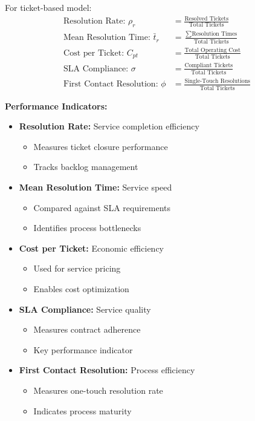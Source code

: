 \documentclass[12pt,a4paper]{article}
\newenvironment{definition}[1]
{\begin{mdframed}[style=definitionstyle,frametitle={Definition: #1}]}
{\end{mdframed}}
\newenvironment{explanation}
{\begin{mdframed}[style=explanationstyle,frametitle={Explanation}]}
{\end{mdframed}}
\begin{document}
\begin{definition}{Ticket Performance Metrics}
For ticket-based model:
\begin{align*}
    \text{Resolution Rate: } \rho_r &= \frac{\text{Resolved Tickets}}{\text{Total Tickets}} \\[1em]
    \text{Mean Resolution Time: } \bar{t}_r &= \frac{\sum \text{Resolution Times}}{\text{Total Tickets}} \\[1em]
    \text{Cost per Ticket: } C_{pt} &= \frac{\text{Total Operating Cost}}{\text{Total Tickets}} \\[1em]
    \text{SLA Compliance: } \sigma &= \frac{\text{Compliant Tickets}}{\text{Total Tickets}} \\[1em]
    \text{First Contact Resolution: } \phi &= \frac{\text{Single-Touch Resolutions}}{\text{Total Tickets}}
\end{align*}
\end{definition}

\begin{explanation}
\textbf{Performance Indicators:}
\begin{itemize}
    \item \textbf{Resolution Rate:} Service completion efficiency
        \begin{itemize}
            \item Measures ticket closure performance
            \item Tracks backlog management
        \end{itemize}
    \item \textbf{Mean Resolution Time:} Service speed
        \begin{itemize}
            \item Compared against SLA requirements
            \item Identifies process bottlenecks
        \end{itemize}
    \item \textbf{Cost per Ticket:} Economic efficiency
        \begin{itemize}
            \item Used for service pricing
            \item Enables cost optimization
        \end{itemize}
    \item \textbf{SLA Compliance:} Service quality
        \begin{itemize}
            \item Measures contract adherence
            \item Key performance indicator
        \end{itemize}
    \item \textbf{First Contact Resolution:} Process efficiency
        \begin{itemize}
            \item Measures one-touch resolution rate
            \item Indicates process maturity
        \end{itemize}
\end{itemize}
\end{explanation}
\end{document}
